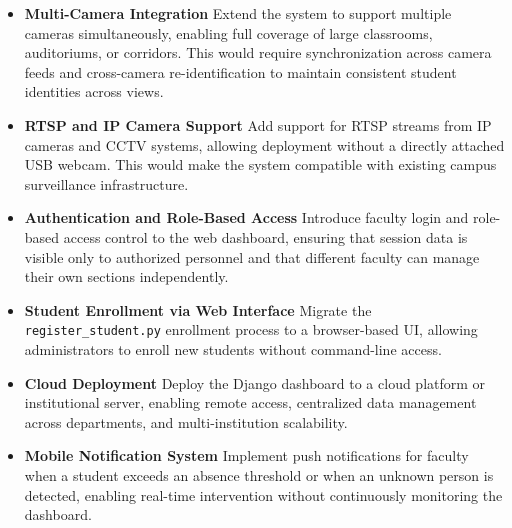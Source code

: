 \documentclass{report}
\begin{document}
\begin{itemize}

\item \textbf{Multi-Camera Integration}
Extend the system to support multiple cameras simultaneously, enabling full coverage of large\vspace{3pt} classrooms, auditoriums, or corridors. This would require synchronization across camera feeds\vspace{3pt} and cross-camera re-identification to maintain consistent student identities across views.

\item \textbf{RTSP and IP Camera Support}
Add support for RTSP streams from IP cameras and CCTV systems, allowing deployment without\vspace{3pt} a directly attached USB webcam. This would make the system compatible with existing campus\vspace{3pt} surveillance infrastructure.

\item \textbf{Authentication and Role-Based Access}
Introduce faculty login and role-based access control to the web dashboard, ensuring that session\vspace{3pt} data is visible only to authorized personnel and that different faculty can manage their own\vspace{3pt} sections independently.

\item \textbf{Student Enrollment via Web Interface}
Migrate the \texttt{register\_student.py} enrollment process to a browser-based UI, allowing\vspace{3pt} administrators to enroll new students without command-line access.

\item \textbf{Cloud Deployment}
Deploy the Django dashboard to a cloud platform or institutional server, enabling remote access,\vspace{3pt} centralized data management across departments, and multi-institution scalability.

\item \textbf{Mobile Notification System}
Implement push notifications for faculty when a student exceeds an absence threshold or when\vspace{3pt} an unknown person is detected, enabling real-time intervention without continuously monitoring\vspace{3pt} the dashboard.


\end{itemize}
\end{document}
